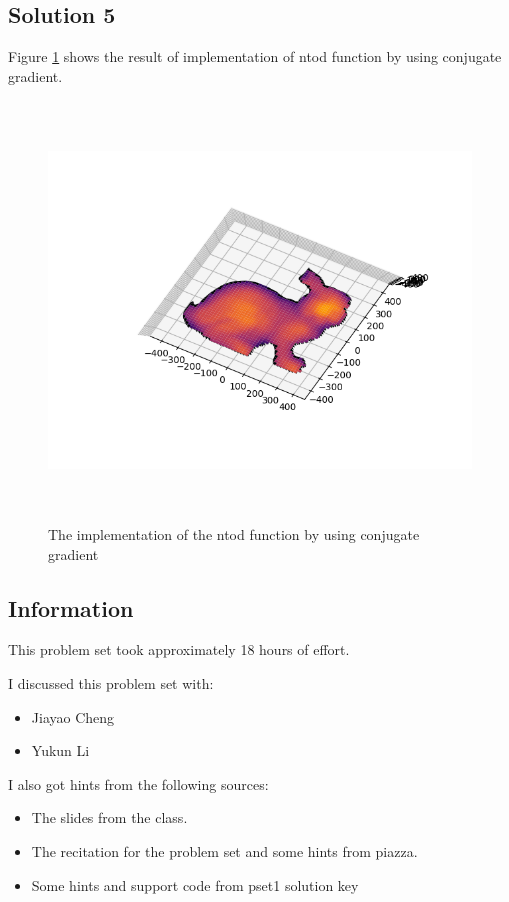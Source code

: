 \documentclass{article}
\newcommand{\info}{\clearpage \subsection*{Information}}
\newcommand{\solution}[1]{\clearpage \subsection*{Solution #1}}
\begin{document}
\solution{5}
Figure \ref{fig:prob5} shows the result of implementation of ntod function by using conjugate gradient.
\begin{figure}[!h]
  \centering
    \includegraphics[height=30em]{code/outputs/prob5.png}
  \caption{The implementation of the ntod function by using conjugate gradient}
  \label{fig:prob5}
\end{figure}




\info

This problem set took approximately 18 hours of effort.

I discussed this problem set with:
\begin{itemize}
\item Jiayao Cheng
\item Yukun Li
\end{itemize}

I also got hints from the following sources:
\begin{itemize}
\item The slides from the class.
\item The recitation for the problem set and some hints from piazza.
\item Some hints and support code from pset1 solution key
\end{itemize}
\end{document}
